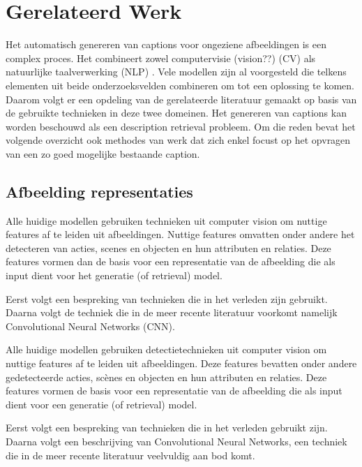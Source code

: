 \chapter{Gerelateerd Werk}
\label{hoofdstuk:related}
Het automatisch genereren van captions voor ongeziene afbeeldingen is een complex proces. Het combineert zowel computervisie (vision??) (CV) als natuurlijke taalverwerking (NLP) . Vele modellen zijn al voorgesteld die telkens elementen uit beide onderzoeksvelden combineren om tot een oplossing te komen. Daarom volgt er een opdeling van de gerelateerde literatuur gemaakt op basis van de gebruikte technieken in deze twee domeinen. Het genereren van captions kan worden beschouwd als een description retrieval probleem.\cite{Hodosh}  Om die reden bevat het volgende overzicht ook methodes van werk dat zich enkel focust op het opvragen van een zo goed mogelijke bestaande caption.

\section{Afbeelding representaties}
Alle huidige modellen gebruiken technieken uit computer vision om nuttige features af te leiden uit afbeeldingen. Nuttige features omvatten onder andere het detecteren van acties, scenes en objecten en hun attributen en relaties. \cite{bernardi}  Deze features vormen dan de basis voor een representatie van de afbeelding die als input dient voor het generatie (of retrieval) model. 

Eerst volgt een bespreking van technieken die in het verleden zijn gebruikt. Daarna volgt de techniek die in de meer recente literatuur voorkomt namelijk Convolutional Neural Networks (CNN).

Alle huidige modellen gebruiken detectietechnieken uit computer vision om nuttige features af te leiden uit afbeeldingen. Deze features bevatten onder andere gedetecteerde acties, sc\`enes en objecten en hun attributen en relaties. Deze features vormen de basis voor een representatie van de afbeelding die als input dient voor een generatie (of retrieval) model. 

Eerst volgt een bespreking van technieken die in het verleden gebruikt zijn. Daarna volgt een beschrijving van Convolutional Neural Networks, een techniek die in de meer recente literatuur veelvuldig aan bod komt.

